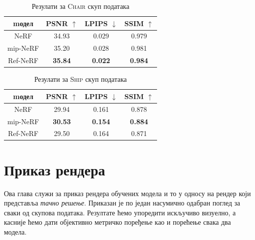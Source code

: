 \documentclass[12pt, a4paper, twoside]{book}
\numberwithin{equation}{chapter}
\numberwithin{theorem}{section}
\numberwithin{definition}{section}
\numberwithin{definitionChapter}{chapter}
\begin{document}
	\begin{table}[H]
		\centering
		\begin{tabular}{cccc} \toprule
			{mодел} 		& {PSNR $\uparrow$} & {LPIPS $\downarrow$}	& {SSIM $\uparrow$} \\ \midrule
			{NeRF} 			& 34.93				& 0.029					& 0.979 \\ 
			{mip-NeRF} 		& 35.20				& 0.028					& 0.981 \\
			{Ref-NeRF}		& \textbf{35.84}	& \textbf{0.022}		& \textbf{0.984} \\ \bottomrule
		\end{tabular}
		\caption{Резулати за \textsc{Chair} скуп података}
		\label{table-chair}
	\end{table}

	\begin{table}[H]
		\centering
		\begin{tabular}{cccc} \toprule
			{mодел}			& {PSNR $\uparrow$} & {LPIPS $\downarrow$}	& {SSIM $\uparrow$} \\ \midrule
			{NeRF}			& 29.94				& 0.161					& 0.878 \\ 
			{mip-NeRF}		& \textbf{30.53} 	& \textbf{0.154}		& \textbf{0.884} \\
			{Ref-NeRF}		& 29.50				& 0.164					& 0.871 \\ \bottomrule
		\end{tabular}
		\caption{Резулати за \textsc{Ship} скуп података}
		\label{table-ship}
	\end{table}

\section{Приказ рендера}
Ова глава служи за приказ рендера обучених модела и то у односу на рендер који представља \textit{тачно решење}.
Приказан је по један насумично одабран поглед за сваки од скупова података. Резултате ћемо упоредити искључиво
визуелно, а касније ћемо дати објективно метричко поређење као и порећење свака два модела.
\end{document}
